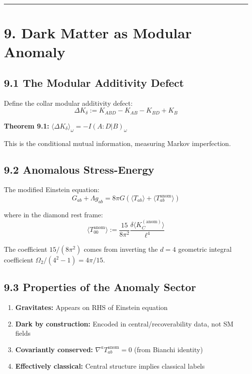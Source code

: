 \begin{center}\rule{0.5\linewidth}{0.5pt}\end{center}

\section{9. Dark Matter as Modular Anomaly}\label{9-dark-matter-as-modular-anomaly}

\subsection{9.1 The Modular Additivity Defect}\label{91-the-modular-additivity-defect}

Define the collar modular additivity defect: \[\Delta K_\delta := K_{ABD} - K_{AB} - K_{BD} + K_B\]

\textbf{Theorem 9.1:} \(\langle \Delta K_\delta \rangle_\omega = -I(A:D|B)_\omega\)

This is the conditional mutual information, measuring Markov imperfection.

\subsection{9.2 Anomalous Stress-Energy}\label{92-anomalous-stress-energy}

The modified Einstein equation: \[G_{ab} + \Lambda g_{ab} = 8\pi G \left(\langle T_{ab} \rangle + \langle T_{ab}^{\text{anom}} \rangle\right)\]

where in the diamond rest frame: \[\langle T_{00}^{\text{anom}} \rangle := \frac{15}{8\pi^2} \frac{\delta\langle K_C^{(\text{anom})} \rangle}{\ell^4}\]

The coefficient \(15/(8\pi^2)\) comes from inverting the \(d=4\) geometric integral coefficient \(\Omega_2/(4^2-1) = 4\pi/15\).

\subsection{9.3 Properties of the Anomaly Sector}\label{93-properties-of-the-anomaly-sector}

\begin{enumerate}
\def\labelenumi{\arabic{enumi}.}
\tightlist
\item
  \textbf{Gravitates:} Appears on RHS of Einstein equation
\item
  \textbf{Dark by construction:} Encoded in central/recoverability data, not SM fields
\item
  \textbf{Covariantly conserved:} \(\nabla^a T_{ab}^{\text{anom}} = 0\) (from Bianchi identity)
\item
  \textbf{Effectively classical:} Central structure implies classical labels
\end{enumerate}

